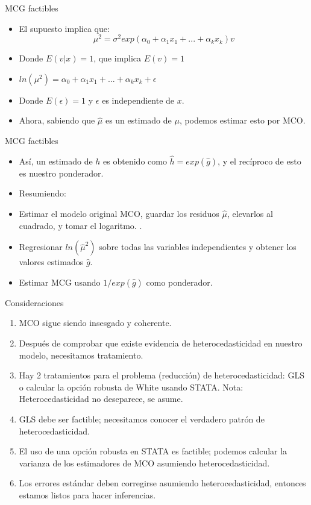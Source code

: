 \begin{frame}{MCG factibles}
	\begin{itemize}
		\item El supuesto implica que:
				$$\mu^2=\sigma^2 exp(\alpha_0+\alpha_1 x_1+...+\alpha_k x_k)v$$
		\item Donde $E(v|x)=1$, que implica $E(v)=1$	
		\item $ln(\mu^2)=\alpha_0+\alpha_1 x_1+...+\alpha_k x_k+\epsilon$
		\item Donde $E(\epsilon)=1$ y $\epsilon$ es independiente de $x$.
		\item Ahora, sabiendo que $\hat \mu$ es un estimado de $\mu$, podemos estimar esto por MCO.
	\end{itemize}
\end{frame}
\begin{frame}{MCG factibles}
	\begin{itemize}
		\item Así, un estimado de $h$ es obtenido como $\hat h=exp(\hat g)$, y el recíproco de esto es nuestro ponderador.
		\item Resumiendo:
		\item Estimar el modelo original MCO, guardar los residuos $\hat\mu$, elevarlos al cuadrado, y tomar el logaritmo.
		.
		\item Regresionar $ln(\hat \mu^2)$ sobre todas las variables independientes y obtener los valores estimados $\hat g$.
		\item Estimar MCG usando $1/exp(\hat g)$ como ponderador. 
	\end{itemize}
\end{frame}
\begin{frame}{Consideraciones}
	\begin{enumerate}
		\item MCO sigue siendo insesgado y coherente.
		\item Después de comprobar que existe evidencia de heterocedasticidad en nuestro modelo, necesitamos tratamiento.
		
		\item Hay 2 tratamientos para el problema (reducción) de heterocedasticidad: GLS o calcular la opción robusta de White usando STATA. Nota: Heterocedasticidad no deseparece, se asume.
		
		\item GLS debe ser factible; necesitamos conocer el verdadero patrón de heterocedasticidad.
		
		\item El uso de una opción robusta en STATA es factible; podemos calcular la varianza de los estimadores de MCO asumiendo heterocedasticidad.
		
		\item Los errores estándar deben corregirse asumiendo heterocedasticidad, entonces estamos listos para hacer inferencias.
	\end{enumerate}
\end{frame}
